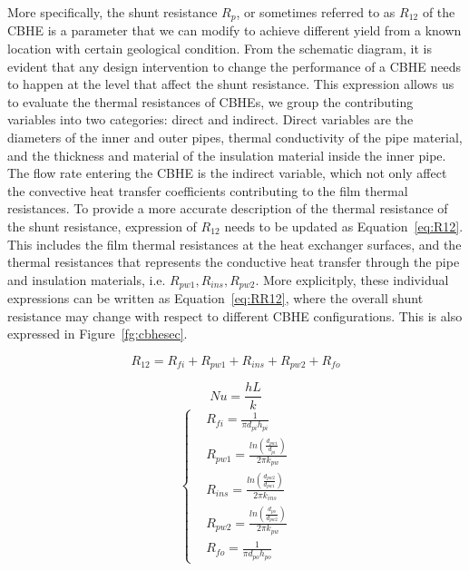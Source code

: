 	More specifically, the shunt resistance $R_p$, or sometimes referred to as $R_{12}$ of the CBHE is a parameter that we can modify to achieve different yield from a known location with certain geological condition. 
	From the schematic diagram, it is evident that any design intervention to change the performance of a CBHE needs to happen at the level that affect the shunt resistance. This expression allows us to evaluate the thermal resistances of CBHEs, we group the contributing variables into two categories: direct and indirect. Direct variables are the diameters of the inner and outer pipes, thermal conductivity of the pipe material, and the thickness and material of the insulation material inside the inner pipe. The flow rate entering the CBHE is the indirect variable, which not only affect the convective heat transfer coefficients contributing to the film thermal resistances. To provide a more accurate description of the thermal resistance of the shunt resistance, expression of $R_{12}$ needs to be updated as Equation~\ref{eq:R12}. This includes the film thermal resistances at the heat exchanger surfaces, and the thermal resistances that represents the conductive heat transfer through the pipe and insulation materials, i.e. $R_{pw1}, R_{ins}, R_{pw2}$. More explicitply, these individual expressions can be written as Equation~\ref{eq:RR12}, where the overall shunt resistance may change with respect to different CBHE configurations. This is also expressed in Figure~\ref{fg:cbhesec}. 
	    
	    \begin{equation}
          R_{12} = R_{fi} + R_{pw1}+ R_{ins}+ R_{pw2} + R_{fo} \label{eq:R12}
        \end{equation}
        
        \begin{equation}
            Nu = \frac{hL}{k}\label{eq:Nuhx}    
        \end{equation}
        \begin{equation}
              \left\{
              \begin{aligned}
              & R_{fi} = \frac{1}{\pi d_{pi} h_{pi}}\\
              & R_{pw1} = \frac{ln(\frac{d_{pw1}}{d_{pi}})}{2\pi k_{pw}}\\
              & R_{ins} = \frac{ln(\frac{d_{pw2}}{d_{pw1}})}{2\pi k_{ins}}\\
              & R_{pw2} = \frac{ln(\frac{d_{po}}{d_{pw2}})}{2\pi k_{pw}}\\
              & R_{fo} = \frac{1}{\pi d_{po} h_{po}}
              \end{aligned}
              \right. \label{eq:RR12}
        \end{equation}
		
